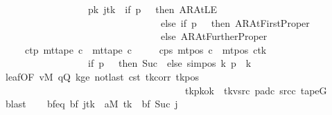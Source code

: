 \begin{isabellebody}
\ \ \ \ \ \ \ \ \ \ \ \ \ \ \ \ \ \ {\isacharparenleft}{\kern0pt}{\isacharquery}{\kern0pt}pk\ j{\isacharparenright}{\kern0pt}{\isacharparenleft}{\kern0pt}{\isacharquery}{\kern0pt}tk\ {\isacharcolon}{\kern0pt}{\isacharequal}{\kern0pt}\ if\ {\isacharquery}{\kern0pt}p\ {\isacharequal}{\kern0pt}\ {}\ then\ AR{\isacharunderscore}{\kern0pt}AtLE\isanewline
\ \ \ \ \ \ \ \ \ \ \ \ \ \ \ \ \ \ \ \ \ \ \ \ \ \ \ \ \ \ \ \ \ else\ if\ {\isacharquery}{\kern0pt}p\ {\isacharequal}{\kern0pt}\ {}\ then\ AR{\isacharunderscore}{\kern0pt}AtFirstProper\isanewline
\ \ \ \ \ \ \ \ \ \ \ \ \ \ \ \ \ \ \ \ \ \ \ \ \ \ \ \ \ \ \ \ \ else\ AR{\isacharunderscore}{\kern0pt}AtFurtherProper{\isacharparenright}{\kern0pt}{\isacharparenright}{\kern0pt}{\isachardoublequoteclose}\isanewline
\ \ \ \ \ c{\isacharprime}{\kern0pt}{\isacharunderscore}{\kern0pt}tp{\isacharcolon}{\kern0pt}\ {\isachardoublequoteopen}mt{\isacharunderscore}{\kern0pt}tape\ c{\isacharprime}{\kern0pt}\ {\isacharequal}{\kern0pt}\ mt{\isacharunderscore}{\kern0pt}tape\ c{\isachardoublequoteclose}\isanewline
\ \ \ \ \ c{\isacharprime}{\kern0pt}{\isacharunderscore}{\kern0pt}ps{\isacharcolon}{\kern0pt}\ {\isachardoublequoteopen}mt{\isacharunderscore}{\kern0pt}pos\ c{\isacharprime}{\kern0pt}\ {\isacharequal}{\kern0pt}\ {\isacharparenleft}{\kern0pt}mt{\isacharunderscore}{\kern0pt}pos\ c{\isacharparenright}{\kern0pt}{\isacharparenleft}{\kern0pt}{\isacharquery}{\kern0pt}tk\ {\isacharcolon}{\kern0pt}{\isacharequal}{\kern0pt}\isanewline
\ \ \ \ \ \ \ \ \ \ \ \ \ \ \ \ \ \ if\ {\isacharquery}{\kern0pt}p\ {\isacharequal}{\kern0pt}\ {}\ then\ Suc\ {}\ else\ sim{\isacharunderscore}{\kern0pt}pos\ {\isacharquery}{\kern0pt}k\ {\isacharquery}{\kern0pt}p\ {\isacharplus}{\kern0pt}\ {\isacharquery}{\kern0pt}k{\isacharparenright}{\kern0pt}{\isachardoublequoteclose}\isanewline
\ \ \ \ \isamarkupfalse%
\ leaf{\isacharbrackleft}{\kern0pt}OF\ vM\ qQ\ kge{}\ notlast\ c{\isacharunderscore}{\kern0pt}st\ tk{\isacharunderscore}{\kern0pt}corr\ tk{\isacharunderscore}{\kern0pt}pos\isanewline
\ \ \ \ \ \ \ \ \ \ \ \ \ \ \ \ \ \ \ \ \ \ \ \ \ \ \ \ \ \ \ \ \ \ \ \ \ \ tk{\isacharunderscore}{\kern0pt}pkok\ {\isacharunderscore}{\kern0pt}\ tk{\isacharunderscore}{\kern0pt}vsrc\ pad{\isacharunderscore}{\kern0pt}c\ src{\isacharunderscore}{\kern0pt}c{\isacharbrackright}{\kern0pt}\ tapeG\ \isamarkupfalse%
\ blast\isanewline
\ \ \isamarkupfalse%
\ bf{\isacharunderscore}{\kern0pt}eq{\isacharcolon}{\kern0pt}\ {\isachardoublequoteopen}{\isacharparenleft}{\kern0pt}{\isacharquery}{\kern0pt}bf\ j{\isacharparenright}{\kern0pt}{\isacharparenleft}{\kern0pt}{\isacharquery}{\kern0pt}tk\ {\isacharcolon}{\kern0pt}{\isacharequal}{\kern0pt}\ {\isacharquery}{\kern0pt}aM\ {\isacharquery}{\kern0pt}tk{\isacharparenright}{\kern0pt}\ {\isacharequal}{\kern0pt}\ {\isacharquery}{\kern0pt}bf\ {\isacharparenleft}{\kern0pt}Suc\ j{\isacharparenright}{\kern0pt}{\isachardoublequoteclose}\isanewline

\end{isabellebody}
